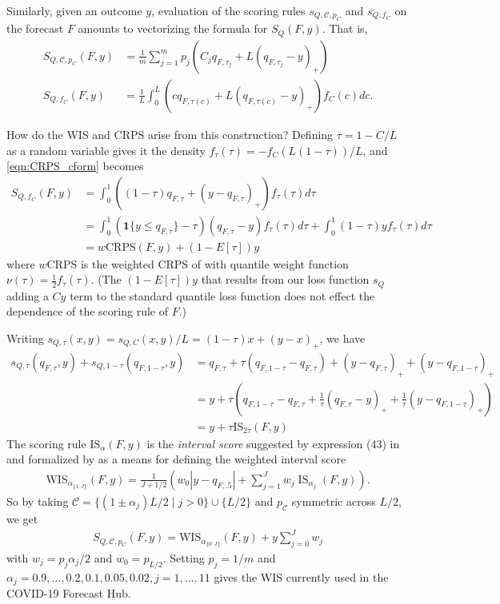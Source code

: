 \documentclass{article}
\begin{document}
Similarly, given an outcome $y$, evaluation of the scoring rules $s_{Q,\mathcal{C}, p_C}$ and $s_{Q,f_C}$ on the forecast $F$ amounts to vectorizing the
formula for $S_Q(F,y)$. That is,
\begin{align}
S_{Q,\mathcal{C}, p_C}(F,y) &= \frac{1}{m}\sum_{j=1}^{m}p_j(C_j q_{F,\tau_j} + L(q_{F,\tau_j} - y)_+) \\
S_{Q, f_C}(F,y) &= \frac{1}{L}\int_{0}^{L}(cq_{F,\tau(c)} + L(q_{F,\tau(c)} - y)_+) f_C(c)dc. \label{eqn:CRPS_cform}
\end{align}

How do the WIS and CRPS arise from this construction? Defining $\tau = 1-C/L$ as a random variable gives it the density 
$f_{\tau}(\tau) = -f_C\left(L(1-\tau)\right)/L$, 
and \eqref{eqn:CRPS_cform} becomes 
\begin{align}
S_{Q, f_C}(F,y) &= \int_{0}^{1}((1-\tau)q_{F,\tau} + (y-q_{F,\tau})_{+})f_{\tau}(\tau)d\tau \\
&= \int_{0}^{1}(\mathbf{1}\{y \leq q_{F,\tau}\}-\tau)(q_{F,\tau} - y)f_{\tau}(\tau)d\tau + \int_{0}^{1}(1-\tau)y f_{\tau}(\tau)d\tau \\
&= w\mathrm{CRPS}(F,y) + (1-E[\tau])y
\end{align}
where $w$CRPS is the weighted CRPS of \cite{gneiting2011weightedScoringRules} with quantile weight function $\nu(\tau) = \frac{1}{2}f_{\tau}(\tau)$. 
(The $(1-E[\tau])y$ that results from our loss function $s_Q$ adding a $Cy$ term to the standard quantile loss function does not effect the dependence of the scoring rule of $F$.)

Writing $s_{Q,\tau}(x,y) = s_{Q,C}(x,y)/L = (1-\tau)x + (y-x)_{+}$, we have
\begin{align}
s_{Q,\tau}(q_{F,\tau},y) + s_{Q,1-\tau}(q_{F,1-\tau},y) &= q_{F,\tau} + \tau(q_{F,1-\tau} - q_{F,\tau}) + (y - q_{F,\tau})_{+} + (y - q_{F,1-\tau})_{+} \\
&= y + \tau\left(q_{F,1-\tau} - q_{F,\tau} + \frac{1}{\tau}(q_{F,\tau} - y)_{+} + \frac{1}{\tau}(y - q_{F,1-\tau})_{+}\right) \\
&= y + \tau \mathrm{IS}_{2\tau}(F,y)
\end{align}
The scoring rule $\mathrm{IS}_{\alpha}(F,y)$ is the \emph{interval score} suggested by expression (43) in \cite{gneiting2007strictly} 
and formalized by \cite{bracher2021evaluating} as a means for defining the weighted interval score 
\begin{align}
\mathrm{WIS}_{\alpha_{\{1: J\}}}(F, y)=\frac{1}{J+1 / 2}\left(w_0 |y-q_{F,.5}|+\sum_{j=1}^J w_j \operatorname{IS}_{\alpha_j}(F, y)\right).
\end{align}
So by taking $\mathcal{C} = \{(1 \pm \alpha_j)L/2 \mid j > 0\}\cup \{L/2\}$ and $p_\mathcal{C}$ symmetric across $L/2$, we get 
\begin{align}	
S_{Q,\mathcal{C}, p_C}(F,y) = \mathrm{WIS}_{\alpha_{\{0: J\}}}(F, y) + y \sum_{j=0}^{J} w_j
\end{align}	
with $w_j = p_{j}\alpha_j/2$ and $w_0 = p_{L/2}$. Setting $p_j=1/m$ and $\alpha_j=0.9, \ldots, 0.2,0.1,0.05,0.02, j = 1,\ldots,11$ gives the WIS currently used in 
the COVID-19 Forecast Hub.
\end{document}
